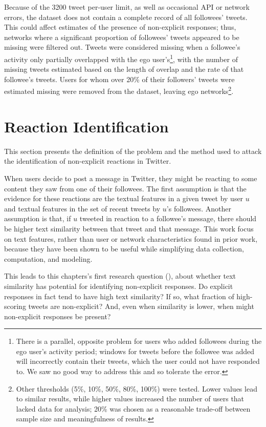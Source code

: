Because of the 3200 tweet per-user limit, as well as occasional API or network errors, the dataset does not contain a complete record of all followees' tweets.  This could affect estimates of the presence of non-explicit responses; thus, networks where a significant proportion of followees' tweets appeared to be missing were filtered out.  Tweets were considered missing when a followee's activity only partially overlapped with the ego user's\footnote{There is a parallel, opposite problem for users who added followees during the ego user's activity period; windows for tweets before the followee was added will incorrectly contain their tweets, which the user could not have responded to.  We saw no good way to address this and so tolerate the error.}, with the number of missing tweets estimated based on the length of overlap and the rate of that followee's tweets.  Users for whom over 20\% of their followers' tweets were estimated missing were removed from the dataset, leaving \totalUsers{} ego networks\footnote{Other thresholds (5\%, 10\%, 50\%, 80\%, 100\%) were tested.  Lower values lead to similar results, while higher values increased the number of users that lacked data for analysis; 20\% was chosen as a reasonable trade-off between sample size and meaningfulness of results.}.


\section{Reaction Identification}

This section presents the definition of the problem and the method used to attack the identification of non-explicit reactions in Twitter.

When users decide to post a message in Twitter, they might be reacting to some content they saw from one of their followees. The first assumption is that the evidence for these reactions are the textual features in a given tweet by user $u$ and textual features in the set of recent tweets by $u$'s followees. Another assumption is that, if $u$ tweeted in reaction to a followee's message, there should be higher text similarity between that tweet and that message. This work focus on text features, rather than user or network characteristics found in prior work, because they have been shown to be useful while simplifying data collection, computation, and modeling.

This leads to this chapters's first research question (\ResearchQuestion\label{rq:similarityPotential}), about whether text similarity has potential for identifying non-explicit responses. 
Do explicit responses in fact tend to have high text similarity? If so, what fraction of high-scoring tweets are non-explicit?  And, even when similarity is lower, when might non-explicit responses be present?

